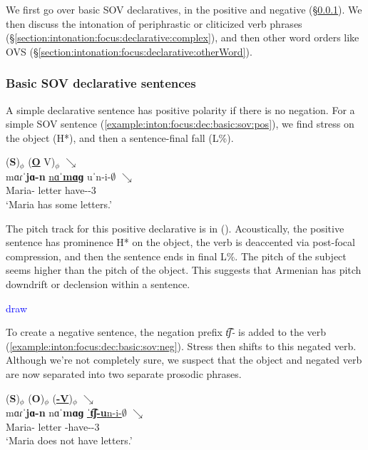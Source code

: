 We first go over basic SOV declaratives, in the positive and negative (\S\ref{section:intonation:focus:declarative:basicSOV}). We then discuss the intonation of periphrastic or cliticized verb phrases (\S\ref{section:intonation:focus:declarative:complex}), and then other word orders like OVS (\S\ref{section:intonation:focus:declarative:otherWord}). 

\subsubsection{Basic SOV declarative sentences}\label{section:intonation:focus:declarative:basicSOV}
A simple declarative sentence has positive polarity if there is no negation. For a simple SOV sentence (\ref{example:inton:focus:dec:basic:sov:pos}), we find stress on the object (H*), and then a sentence-final fall (L\%).


\begin{exe}
	\ex \glll   (\textbf{S})$_\phi$ (\underline{\textbf{O}} V)$_\phi$ $\searrow$ \\
	mɑɾˈ\textbf{jɑ-n} \underline{nɑˈ\textbf{mɑɡ}} uˈn-i-$\emptyset$ $\searrow$ \\
	Maria-{} letter have-{\thgloss}-3{\sg}   \\
	\trans `Maria has some letters.' \label{example:inton:focus:dec:basic:sov:pos}
	\\ 
\end{exe}

The pitch track for this positive declarative is in (). Acoustically, the positive sentence has prominence H* on the object, the verb is deaccented via post-focal compression, and then the sentence ends in final L\%. The pitch of the subject seems higher than the pitch of the object. This suggests that Armenian has pitch downdrift or declension within a sentence. 

\textcolor{blue}{draw}



To create a negative sentence, the negation prefix \textit{t͡ʃ-} is added to the verb (\ref{example:inton:focus:dec:basic:sov:neg}). Stress then shifts to this negated verb. Although we're not completely sure, we suspect that the object and negated verb are now separated into two separate prosodic phrases. 

\begin{exe}
	\ex \glll   (\textbf{S})$_\phi$ (\textbf{O})$_\phi$ (\underline{\textbf{{\neggloss}-V}})$_\phi$ $\searrow$ \\
	mɑɾˈ\textbf{jɑ-n} {nɑˈ\textbf{mɑɡ}} \underline{ˈ\textbf{t͡ʃ-u}n-i-$\emptyset$}  $\searrow$ \\
	Maria-{} letter {\neggloss}-have-{\thgloss}-3{\sg}   \\
	\trans `Maria does not have letters.' \label{example:inton:focus:dec:basic:sov:neg}
	\\ 
\end{exe}

